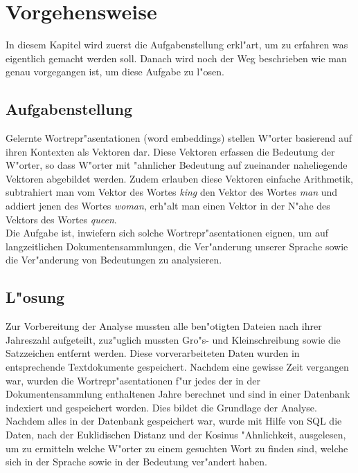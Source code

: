 \chapter{Vorgehensweise}
In diesem Kapitel wird zuerst die Aufgabenstellung erkl"art, um zu erfahren was eigentlich gemacht werden soll. Danach wird noch der Weg beschrieben wie man genau vorgegangen ist, um diese Aufgabe zu l"osen.

\section{Aufgabenstellung}
Gelernte Wortrepr"asentationen (word embeddings) stellen W"orter basierend auf ihren Kontexten als Vektoren dar. Diese Vektoren erfassen die Bedeutung der W"orter, so dass W"orter mit "ahnlicher Bedeutung auf zueinander naheliegende Vektoren abgebildet werden. Zudem erlauben diese Vektoren einfache Arithmetik, subtrahiert man vom Vektor des Wortes \textit{king} den Vektor des Wortes \textit{man} und addiert jenen des Wortes \textit{woman}, erh"alt man einen Vektor in der N"ahe des Vektors des Wortes \textit{queen}.\\
Die Aufgabe ist, inwiefern sich solche Wortrepr"asentationen eignen, um auf langzeitlichen Dokumentensammlungen, die Ver"anderung unserer Sprache sowie die Ver"anderung von Bedeutungen zu analysieren.

\section{L"osung}
Zur Vorbereitung der Analyse mussten alle ben"otigten Dateien nach ihrer Jahreszahl aufgeteilt, zuz"uglich mussten Gro"s- und Kleinschreibung sowie die Satzzeichen entfernt werden. Diese vorverarbeiteten Daten wurden in entsprechende Textdokumente gespeichert. Nachdem eine gewisse Zeit vergangen war, wurden die Wortrepr"asentationen f"ur jedes der in der Dokumentensammlung enthaltenen Jahre berechnet und sind in einer Datenbank indexiert und gespeichert worden. Dies bildet die Grundlage der Analyse.
Nachdem alles in der Datenbank gespeichert war, wurde mit Hilfe von SQL die Daten, nach der Euklidischen Distanz und der Kosinus "Ahnlichkeit, ausgelesen, um zu ermitteln welche W"orter zu einem gesuchten Wort zu finden sind, welche sich in der Sprache sowie in der Bedeutung ver"andert haben.
